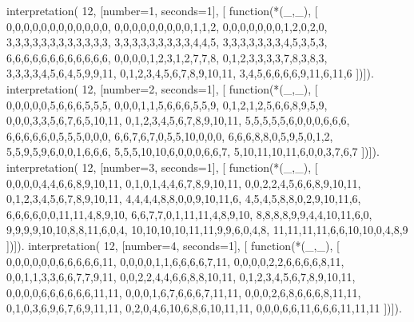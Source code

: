 interpretation( 12, [number=1, seconds=1], [
  function(*(_,_), [
    0,0,0,0,0,0,0,0,0,0,0,0,
    0,0,0,0,0,0,0,0,0,1,1,2,
    0,0,0,0,0,0,0,1,2,0,2,0,
    3,3,3,3,3,3,3,3,3,3,3,3,
    3,3,3,3,3,3,3,3,3,4,4,5,
    3,3,3,3,3,3,3,4,5,3,5,3,
    6,6,6,6,6,6,6,6,6,6,6,6,
    0,0,0,0,1,2,3,1,2,7,7,8,
    0,1,2,3,3,3,3,7,8,3,8,3,
    3,3,3,3,4,5,6,4,5,9,9,11,
    0,1,2,3,4,5,6,7,8,9,10,11,
    3,4,5,6,6,6,6,9,11,6,11,6 ])]).
interpretation( 12, [number=2, seconds=1], [
  function(*(_,_), [
    0,0,0,0,0,5,6,6,6,5,5,5,
    0,0,0,1,1,5,6,6,6,5,5,9,
    0,1,2,1,2,5,6,6,8,9,5,9,
    0,0,0,3,3,5,6,7,6,5,10,11,
    0,1,2,3,4,5,6,7,8,9,10,11,
    5,5,5,5,5,6,0,0,0,6,6,6,
    6,6,6,6,6,0,5,5,5,0,0,0,
    6,6,7,6,7,0,5,5,10,0,0,0,
    6,6,6,8,8,0,5,9,5,0,1,2,
    5,5,9,5,9,6,0,0,1,6,6,6,
    5,5,5,10,10,6,0,0,0,6,6,7,
    5,10,11,10,11,6,0,0,3,7,6,7 ])]).
interpretation( 12, [number=3, seconds=1], [
  function(*(_,_), [
    0,0,0,0,4,4,6,6,8,9,10,11,
    0,1,0,1,4,4,6,7,8,9,10,11,
    0,0,2,2,4,5,6,6,8,9,10,11,
    0,1,2,3,4,5,6,7,8,9,10,11,
    4,4,4,4,8,8,0,0,9,10,11,6,
    4,5,4,5,8,8,0,2,9,10,11,6,
    6,6,6,6,0,0,11,11,4,8,9,10,
    6,6,7,7,0,1,11,11,4,8,9,10,
    8,8,8,8,9,9,4,4,10,11,6,0,
    9,9,9,9,10,10,8,8,11,6,0,4,
    10,10,10,10,11,11,9,9,6,0,4,8,
    11,11,11,11,6,6,10,10,0,4,8,9 ])]).
interpretation( 12, [number=4, seconds=1], [
  function(*(_,_), [
    0,0,0,0,0,0,6,6,6,6,6,11,
    0,0,0,0,1,1,6,6,6,6,7,11,
    0,0,0,0,2,2,6,6,6,6,8,11,
    0,0,1,1,3,3,6,6,7,7,9,11,
    0,0,2,2,4,4,6,6,8,8,10,11,
    0,1,2,3,4,5,6,7,8,9,10,11,
    0,0,0,0,6,6,6,6,6,6,11,11,
    0,0,0,1,6,7,6,6,6,7,11,11,
    0,0,0,2,6,8,6,6,6,8,11,11,
    0,1,0,3,6,9,6,7,6,9,11,11,
    0,2,0,4,6,10,6,8,6,10,11,11,
    0,0,0,6,6,11,6,6,6,11,11,11 ])]).
